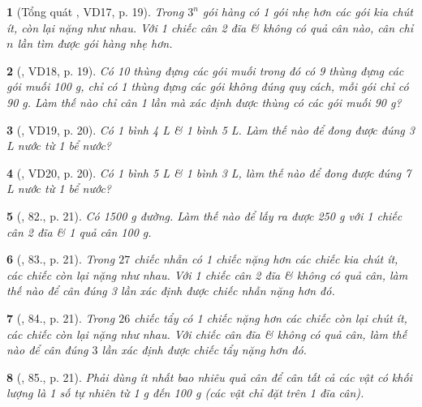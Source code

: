 \documentclass{article}
\newtheorem{baitoan}{}
\begin{document}
\begin{baitoan}[Tổng quát \cite{Tuyen_Toan_6}, VD17, p. 19]
	Trong $3^n$ gói hàng có 1 gói nhẹ hơn các gói kia chút ít, còn lại nặng như nhau. Với 1 chiếc cân 2 đĩa \& không có quả cân nào, cân chỉ $n$ lần tìm được gói hàng nhẹ hơn.
\end{baitoan}

\begin{baitoan}[\cite{Tuyen_Toan_6}, VD18, p. 19]
	Có 10 thùng đựng các gói muối trong đó có 9 thùng đựng các gói muối {\rm100 g}, chỉ có 1 thùng đựng các gói không đúng quy cách, mỗi gói chỉ có {\rm90 g}. Làm thế nào chỉ cân 1 lần mà xác định được thùng có các gói muối {\rm90 g}?
\end{baitoan}

\begin{baitoan}[\cite{Tuyen_Toan_6}, VD19, p. 20]
	Có 1 bình {\rm4 L} \& 1 bình {\rm5 L}. Làm thế nào để đong được đúng {\rm3 L} nước từ 1 bể nước?
\end{baitoan}

\begin{baitoan}[\cite{Tuyen_Toan_6}, VD20, p. 20]
	Có 1 bình {\rm5 L} \& 1 bình {\rm3 L}, làm thế nào để đong được đúng {\rm7 L} nước từ 1 bể nước?
\end{baitoan}

\begin{baitoan}[\cite{Tuyen_Toan_6}, 82., p. 21]
	Có {\rm1500 g} đường. Làm thế nào để lấy ra được {\rm250 g} với 1 chiếc cân 2 đĩa \& 1 quả cân {\rm100 g}.
\end{baitoan}

\begin{baitoan}[\cite{Tuyen_Toan_6}, 83., p. 21]
	Trong $27$ chiếc nhẫn có 1 chiếc nặng hơn các chiếc kia chút ít, các chiếc còn lại nặng như nhau. Với 1 chiếc cân 2 đĩa \& không có quả cân, làm thế nào để cân đúng 3 lần xác định được chiếc nhẫn nặng hơn đó.
\end{baitoan}

\begin{baitoan}[\cite{Tuyen_Toan_6}, 84., p. 21]
	Trong $26$ chiếc tẩy có 1 chiếc nặng hơn các chiếc còn lại chút ít, các chiếc còn lại nặng như nhau. Với chiếc cân đĩa \& không có quả cân, làm thế nào để cân đúng $3$ lần xác định được chiếc tẩy nặng hơn đó.
\end{baitoan}

\begin{baitoan}[\cite{Tuyen_Toan_6}, 85., p. 21]
	Phải dùng ít nhất bao nhiêu quả cân để cân tất cả các vật có khối lượng là 1 số tự nhiên từ {\rm1 g} đến {\rm100 g} (các vật chỉ đặt trên 1 đĩa cân).
\end{baitoan}
\end{document}

